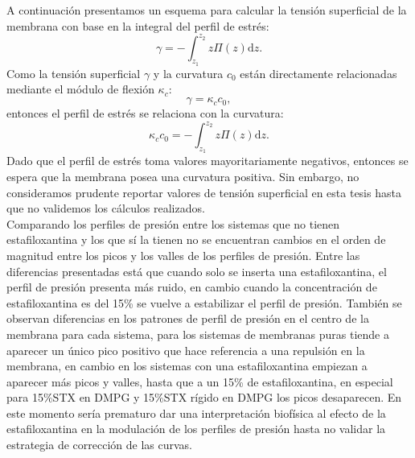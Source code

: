 A continuaci\'{o}n presentamos un esquema para calcular la tensi\'{o}n superficial de la membrana con base en la integral del perfil de estr\'{e}s:
\begin{equation}
    \gamma=-\int_{z_1}^{z_2}z\Pi(z)\mathrm{d}z.
\end{equation}
Como la tensi\'{o}n superficial $\gamma$ y la curvatura $c_0$ est\'{a}n directamente relacionadas mediante el m\'{o}dulo de flexi\'{o}n $\kappa_c$:
\begin{equation}
    \gamma=\kappa_c c_0,
\end{equation}
entonces el perfil de estr\'{e}s se relaciona con la curvatura:
\begin{equation}
    \kappa_{c}c_0=-\int_{z_1}^{z_2}z\Pi(z)\mathrm{d}z.
\end{equation}
Dado que el perfil de estr\'{e}s toma valores mayoritariamente negativos, entonces se espera que la membrana posea una curvatura positiva. Sin embargo, no consideramos prudente reportar valores de tensi\'{o}n superficial en esta tesis hasta que no  validemos los c\'{a}lculos realizados.\\

Comparando los perfiles de presi\'{o}n entre los sistemas que no tienen estafiloxantina y los que s\'{i} la tienen no se encuentran cambios  en el orden de magnitud entre los picos y los valles de los perfiles de presi\'{o}n. Entre las diferencias presentadas est\'{a} que cuando solo se inserta una estafiloxantina, el perfil de presi\'{o}n presenta m\'{a}s ruido, en cambio cuando la concentraci\'{o}n de estafiloxantina es del 15\% se vuelve a estabilizar el perfil de presi\'{o}n. Tambi\'{e}n se observan diferencias en los patrones de perfil de presi\'{o}n en el centro de la membrana para cada sistema, para los sistemas de membranas puras tiende a aparecer un \'{u}nico pico positivo que hace referencia a una repulsi\'{o}n en la membrana, en cambio en los sistemas con una estafiloxantina empiezan a aparecer m\'{a}s picos y valles, hasta que a un 15\% de estafiloxantina, en especial para 15\%STX en DMPG y 15\%STX r\'{i}gido en DMPG los picos desaparecen. En este momento ser\'{i}a prematuro dar una interpretaci\'{o}n biof\'{i}sica al efecto de la estafiloxantina en la modulaci\'{o}n de los perfiles de presi\'{o}n hasta no validar la estrategia de correcci\'{o}n de las curvas.\\ 

